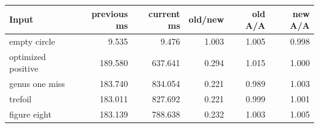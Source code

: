 \begin{center}
\small
\begin{tabular}{lrrrrr}
\toprule
Input & previous ms & current ms & old/new & old A/A & new A/A\\
\midrule
empty circle & 9.535 & 9.476 & 1.003 & 1.005 & 0.998\\
optimized positive & 189.580 & 637.641 & 0.294 & 1.015 & 1.000\\
genus one miss & 183.740 & 834.054 & 0.221 & 0.989 & 1.003\\
trefoil & 183.011 & 827.692 & 0.221 & 0.999 & 1.001\\
figure eight & 183.139 & 788.638 & 0.232 & 1.003 & 1.005\\
\bottomrule
\end{tabular}
\end{center}
